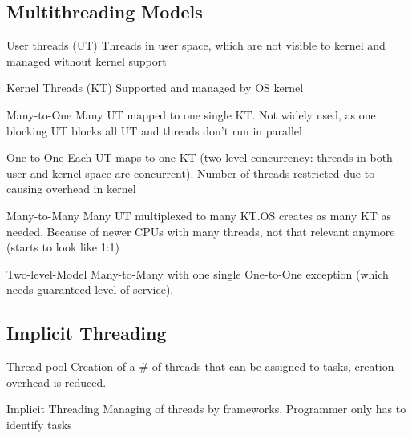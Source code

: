 \subsection*{Multithreading Models}
\begin{definition}
  \item[User threads (UT)] Threads in user space, which are not visible to kernel and managed without kernel support
  \item[Kernel Threads (KT)] Supported and managed by OS kernel
  \item[Many-to-One] Many UT mapped to one single KT. Not widely used, as one blocking UT blocks all UT and threads don't run in parallel
  \item[One-to-One] Each UT maps to one KT (two-level-concurrency: threads in both user and kernel space are concurrent). Number of threads restricted due to causing overhead in kernel
  \item[Many-to-Many] Many UT multiplexed to many KT.OS creates as many KT as needed. Because of newer CPUs with many threads, not that relevant anymore (starts to look like 1:1)
  \item[Two-level-Model] Many-to-Many with one single One-to-One exception (which needs guaranteed level of service). 
\end{definition}

\subsection*{Implicit Threading}
\begin{definition}
  \item[Thread pool] Creation of a # of threads that can be assigned to tasks, creation overhead is reduced.
  \item[Implicit Threading] Managing of threads by frameworks. Programmer only has to identify tasks
\end{definition}

